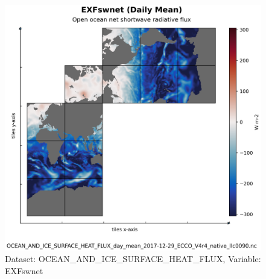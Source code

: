 \begin{figure}[H]
\centering
\includegraphics[scale=0.55]{../images/plots/native_plots/Ocean_and_Sea-Ice_Surface_Heat_Fluxes/EXFswnet.png}
\caption{Dataset: OCEAN\_AND\_ICE\_SURFACE\_HEAT\_FLUX, Variable: EXFswnet}
\label{tab:table-OCEAN_AND_ICE_SURFACE_HEAT_FLUX_EXFswnet-Plot}
\end{figure}
\pagebreak
